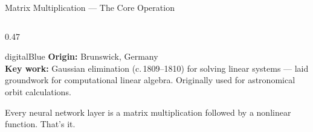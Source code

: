 \begin{frame}{Matrix Multiplication --- The Core Operation}

  \begin{columns}[T]
    \begin{column}{0.47\textwidth}
      \begin{personbox}{digitalBlue}
        \small
        \textbf{Origin:} Brunswick, Germany\\
        \textbf{Key work:} Gaussian elimination (c.\,1809--1810) for solving
        linear systems --- laid groundwork for computational linear algebra.
        Originally used for astronomical orbit calculations.
      \end{personbox}

      \vspace{0.5em}
      \begin{insightbox}
        Every neural network layer is a matrix multiplication
        followed by a nonlinear function. That's it.
      \end{insightbox}
    \end{column}


\end{columns}
\end{frame}
